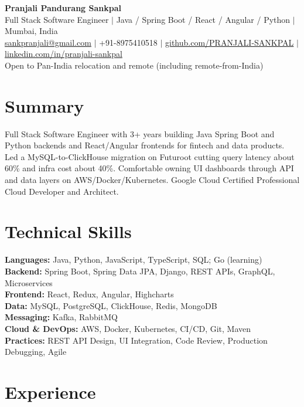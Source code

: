 \documentclass[9pt,letterpaper]{extarticle}
\begin{document}
\begin{center}
  {\fontsize{16}{18}\selectfont\bfseries Pranjali Pandurang Sankpal}\\[3pt]
  {\fontsize{10}{12}\selectfont Full Stack Software Engineer $|$ Java / Spring Boot / React / Angular / Python $|$ Mumbai, India}\\[2pt]
  {\fontsize{9}{11}\selectfont
  \href{mailto:sankpranjali@gmail.com}{sankpranjali@gmail.com}
  $|$ +91-8975410518
  $|$ \href{https://github.com/PRANJALI-SANKPAL}{github.com/PRANJALI-SANKPAL}
  $|$ \href{https://www.linkedin.com/in/pranjali-sankpal-aa1636232/}{linkedin.com/in/pranjali-sankpal}}\\[1pt]
  {\fontsize{8.5}{10}\selectfont Open to Pan-India relocation and remote (including remote-from-India)}
\end{center}

\section*{Summary}
Full Stack Software Engineer with 3+ years building Java Spring Boot and Python backends and React/Angular frontends for fintech and data products. Led a MySQL-to-ClickHouse migration on Futuroot cutting query latency about 60\% and infra cost about 40\%. Comfortable owning UI dashboards through API and data layers on AWS/Docker/Kubernetes. Google Cloud Certified Professional Cloud Developer and Architect.

\section*{Technical Skills}
\textbf{Languages:} Java, Python, JavaScript, TypeScript, SQL; Go (learning)\\
\textbf{Backend:} Spring Boot, Spring Data JPA, Django, REST APIs, GraphQL, Microservices\\
\textbf{Frontend:} React, Redux, Angular, Highcharts\\
\textbf{Data:} MySQL, PostgreSQL, ClickHouse, Redis, MongoDB\\
\textbf{Messaging:} Kafka, RabbitMQ\\
\textbf{Cloud \& DevOps:} AWS, Docker, Kubernetes, CI/CD, Git, Maven\\
\textbf{Practices:} REST API Design, UI Integration, Code Review, Production Debugging, Agile

\section*{Experience}
\end{document}
